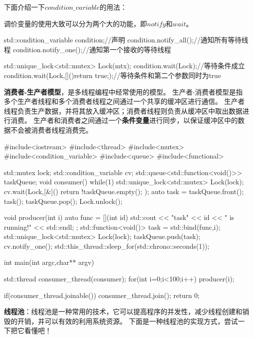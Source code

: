下面介绍一下$condition\_variable$的用法：

调价变量的使用大致可以分为两个大的功能，即$notify$和$wait$。

\begin{tcode}
std::condition_variable condition;//声明
condition.notify_all();//通知所有等待线程
condition.notify_one();//通知第一个接收的等待线程

std::unique_lock<std::mutex> Lock(mtx);
condition.wait(Lock);//等待条件成立
condition.wait(Lock,[](){return true;});//等待条件和第二个参数同时为true
\end{tcode}

\textbf{消费者-生产者模型}，是多线程编程中经常使用的模型。
生产者-消费者模型是指多个生产者线程和多个消费者线程之间通过一个共享的缓冲区进行通信。
生产者线程负责生产数据，并将其放入缓冲区；消费者线程则负责从缓冲区中取出数据进行消费。
生产者和消费者之间通过一个\textbf{条件变量}进行同步，以保证缓冲区中的数据不会被消费者线程消费完。

\begin{tcode}
#include<iostream>
#include<thread>
#include<mutex>
#include<condition_variable>
#include<queue>
#include<functional>

std::mutex lock;
std::condition_variable cv;
std::queue<std::function<void()>> taskQueue;
void consumer(){
    while(1){
        std::unique_lock<std::mutex> Lock(lock);
        cv.wait(Lock,[&](){
            return !taskQueue.empty();
        });
        auto task = taskQueue.front();
        task();
        taskQueue.pop();
        Lock.unlock();
    }
}

void producer(int i){
    auto func = [](int id){
        std::cout << "task" << id << " is running!" << std::endl;
    };
    std::function<void()> task = std::bind(func,i);
    {
        std::unique_lock<std::mutex> Lock(lock);
        taskQueue.push(task);
    }
    cv.notify_one();
    std::this_thread::sleep_for(std::chrono::seconds(1));
}

int main(int argc,char** argv){
    std::thread consumer_thread(consumer);
    for(int i=0;i<100;i++){
        producer(i);
    }

    if(consumer_thread.joinable())
        consumer_thread.join();
    return 0;
}
\end{tcode}

\textbf{线程池}：线程池是一种常用的技术，它可以提高程序的并发性，减少线程创建和销毁的开销，并可以有效的利用系统资源。
下面是一种线程池的实现方式，尝试一下把它看懂吧！

